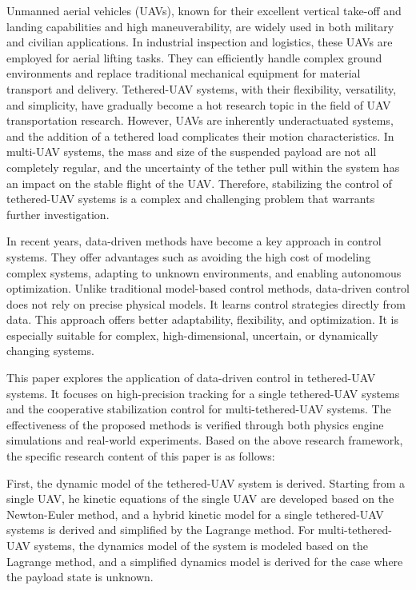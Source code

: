 \documentclass[lang=chs, degree=master, blindreview=false, winfonts=true]{yanputhesis}
\begin{document}
\begin{engabstract}                                         
	Unmanned aerial vehicles (UAVs), known for their excellent vertical take-off and landing capabilities and high maneuverability, are widely used in both military and civilian applications. In industrial inspection and logistics, these UAVs are employed for aerial lifting tasks. They can efficiently handle complex ground environments and replace traditional mechanical equipment for material transport and delivery. Tethered-UAV systems, with their flexibility, versatility, and simplicity, have gradually become a hot research topic in the field of UAV transportation research. However, UAVs are inherently underactuated systems, and the addition of a tethered load complicates their motion characteristics. In multi-UAV systems, the mass and size of the suspended payload are not all completely regular, and the uncertainty of the tether pull within the system has an impact on the stable flight of the UAV. Therefore, stabilizing the control of tethered-UAV systems is a complex and challenging problem that warrants further investigation.
		
	In recent years, data-driven methods have become a key approach in control systems. They offer advantages such as avoiding the high cost of modeling complex systems, adapting to unknown environments, and enabling autonomous optimization. Unlike traditional model-based control methods, data-driven control does not rely on precise physical models. It learns control strategies directly from data. This approach offers better adaptability, flexibility, and optimization. It is especially suitable for complex, high-dimensional, uncertain, or dynamically changing systems.
	
	This paper explores the application of data-driven control in tethered-UAV systems. It focuses on high-precision tracking for a single tethered-UAV systems and the cooperative stabilization control for multi-tethered-UAV systems. The effectiveness of the proposed methods is verified through both physics engine simulations and real-world experiments. Based on the above research framework, the specific research content of this paper is as follows:
	
	First, the dynamic model of the tethered-UAV system is derived. Starting from a single UAV, he kinetic equations of the single UAV are developed based on the Newton-Euler method, and a hybrid kinetic model for a single tethered-UAV systems is derived and simplified by the Lagrange method. For multi-tethered-UAV systems, the dynamics model of the system is modeled based on the Lagrange method, and a simplified dynamics model is derived for the case where the payload state is unknown.
	

\end{engabstract}
\end{document}
